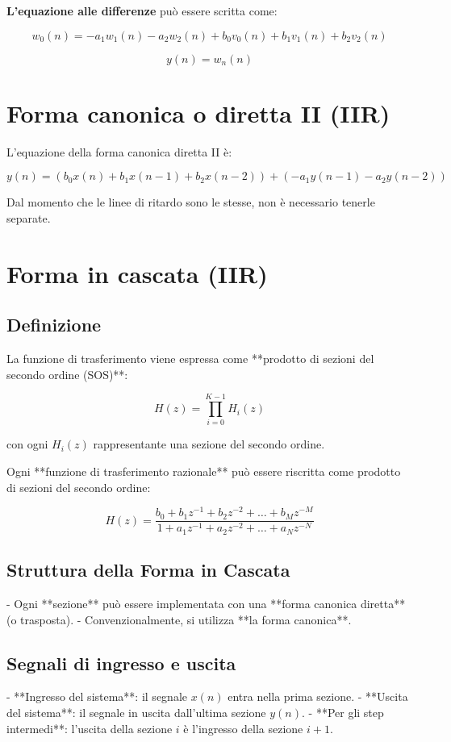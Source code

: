 \textbf{L'equazione alle differenze} può essere scritta come:

\[
w_0(n) = - a_1 w_1(n) - a_2 w_2(n) + b_0 v_0(n) + b_1 v_1(n) + b_2 v_2(n)
\]

\[
y(n) = w_n(n)
\]
\section{Forma canonica o diretta II (IIR)}

L'equazione della forma canonica diretta II è:

\[
y(n) = (b_0 x(n) + b_1 x(n-1) + b_2 x(n-2)) + (-a_1 y(n-1) - a_2 y(n-2))
\]

Dal momento che le linee di ritardo sono le stesse, non è necessario tenerle separate.
\section{Forma in cascata (IIR)}

\subsection*{Definizione}

La funzione di trasferimento viene espressa come **prodotto di sezioni del secondo ordine (SOS)**:

\[
H(z) = \prod_{i=0}^{K-1} H_i(z)
\]

con ogni \( H_i(z) \) rappresentante una sezione del secondo ordine.

Ogni **funzione di trasferimento razionale** può essere riscritta come prodotto di sezioni del secondo ordine:

\[
H(z) = \frac{b_0 + b_1 z^{-1} + b_2 z^{-2} + \dots + b_M z^{-M}}{1 + a_1 z^{-1} + a_2 z^{-2} + \dots + a_N z^{-N}}
\]

\subsection*{Struttura della Forma in Cascata}

- Ogni **sezione** può essere implementata con una **forma canonica diretta** (o trasposta).
- Convenzionalmente, si utilizza **la forma canonica**.

\subsection*{Segnali di ingresso e uscita}

- **Ingresso del sistema**: il segnale \( x(n) \) entra nella prima sezione.
- **Uscita del sistema**: il segnale in uscita dall'ultima sezione \( y(n) \).
- **Per gli step intermedi**: l’uscita della sezione \( i \) è l’ingresso della sezione \( i+1 \).

